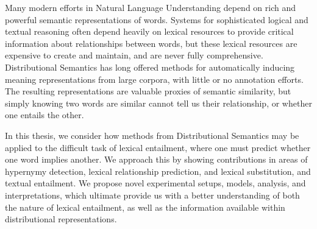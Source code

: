 Many modern efforts in Natural Language Understanding depend on rich and
powerful semantic representations of words. Systems for sophisticated logical
and textual reasoning often depend heavily on
lexical resources to provide critical information about relationships
between words, but these lexical resources are expensive to create and
maintain, and are never fully comprehensive. Distributional Semantics has
long offered methods for automatically inducing meaning representations from
large corpora, with little or no annotation efforts. The resulting
representations are valuable proxies of semantic similarity, but simply knowing
two words are similar cannot tell us their relationship, or whether one
entails the other.

In this thesis, we consider how methods from Distributional Semantics may be
applied to the difficult task of lexical entailment, where one must predict whether
one word implies another. We approach this by
showing contributions in areas of hypernymy detection, lexical relationship
prediction, and lexical substitution, and textual entailment. We propose novel
experimental setups, models, analysis, and interpretations, which ultimate
provide us with a better understanding of both the nature of lexical entailment,
as well as the information available within distributional representations.


